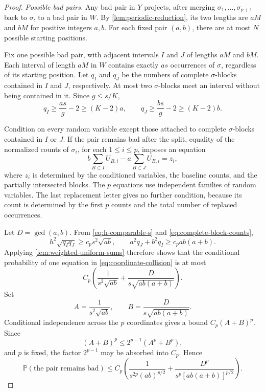 \documentclass[10pt,a4paper]{amsart}
\newcommand{\Prob}{\mathbb P}
\begin{document}
\begin{proof}
\emph{Possible bad pairs.}
Any bad pair in \(Y\) projects, after merging \(\sigma_1,\ldots,\sigma_{p+1}\) back to \(\sigma\), to a bad pair in \(W\). By \cref{lem:periodic-reduction}, its two lengths are \(aM\) and \(bM\) for positive integers \(a,b\). For each fixed pair \((a,b)\), there are at most \(N\) possible starting positions.

Fix one possible bad pair, with adjacent intervals \(I\) and \(J\) of lengths \(aM\) and \(bM\). Each interval of length \(aM\) in \(W\) contains exactly \(as\) occurrences of \(\sigma\), regardless of its starting position. Let \(q_I\) and \(q_J\) be the numbers of complete \(\sigma\)-blocks contained in \(I\) and \(J\), respectively. At most two \(\sigma\)-blocks meet an interval without being contained in it. Since \(g\le s/K\),
\begin{equation}\label{eq:complete-block-counts}
        q_I\ge \frac{as}{g}-2\ge (K-2)a,
        \qquad
        q_J\ge \frac{bs}{g}-2\ge (K-2)b.
\end{equation}

Condition on every random variable except those attached to complete \(\sigma\)-blocks contained in \(I\) or \(J\). If the pair remains bad after the split, equality of the normalized counts of \(\sigma_i\), for each \(1\le i\le p\), imposes an equation
\begin{equation}\label{eq:coordinate-collision}
        b\sum_{B\subset I}U_{B,i}
        -a\sum_{B\subset J}U_{B,i}
        =z_i,
\end{equation}
where \(z_i\) is determined by the conditioned variables, the baseline counts, and the partially intersected blocks. The \(p\) equations use independent families of random variables. The last replacement letter gives no further condition, because its count is determined by the first \(p\) counts and the total number of replaced occurrences.

Let \(D=\gcd(a,b)\). From \eqref{eq:h-comparable-s} and \eqref{eq:complete-block-counts},
\[
 h^2\sqrt{q_Iq_J}\ge c_ps^2\sqrt{ab},
 \qquad
 a^2q_J+b^2q_I\ge c_pab(a+b).
\]
Applying \cref{lem:weighted-uniform-sums} therefore shows that the conditional probability of one equation in \eqref{eq:coordinate-collision} is at most
\begin{equation}\label{eq:one-coordinate-survival}
        C_p\left(
        \frac{1}{s^2\sqrt{ab}}
        +\frac{D}{s\sqrt{ab(a+b)}}
        \right).
\end{equation}
Set
\[
 A=\frac{1}{s^2\sqrt{ab}},
 \qquad
 B=\frac{D}{s\sqrt{ab(a+b)}}.
\]
Conditional independence across the \(p\) coordinates gives a bound \(C_p(A+B)^p\). Since
\[
        (A+B)^p\le 2^{p-1}(A^p+B^p),
\]
and \(p\) is fixed, the factor \(2^{p-1}\) may be absorbed into \(C_p\). Hence
\begin{equation}\label{eq:candidate-survival}
 \Prob(\text{the pair remains bad})
 \le C_p\left(
        \frac{1}{s^{2p}(ab)^{p/2}}
        +\frac{D^p}{s^p[ab(a+b)]^{p/2}}
 \right).
\end{equation}


\end{proof}
\end{document}
